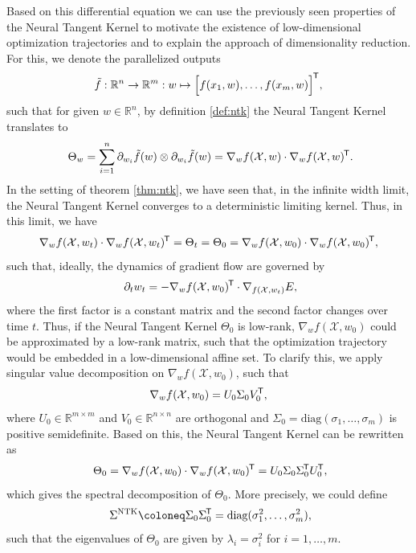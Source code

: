 \documentclass[11pt, a4paper]{article}
\newcommand{\R}{\mathbb{R}}
\newcommand{\X}{\mathcal{X}}
\newcommand*{\tr}{^{\mkern-1.5mu\mathsf{T}}}
\begin{document}
Based on this differential equation we can use the previously seen properties of the Neural Tangent Kernel to motivate the existence of low-dimensional optimization trajectories and to explain the approach of dimensionality reduction. For this, we denote the parallelized outputs
\[ \tilde{f}: \R^{n} \to \R^m : w \mapsto \Big [ f(x_1,w), \dots, f(x_m,w) \Big ]\tr , \]
such that for given $w \in \R^n$, by definition \ref{def:ntk} the Neural Tangent Kernel translates to
\[ \Theta_{w} = \sum_{i=1}^{n} \partial_{w_i} \tilde{f}(w) \otimes \partial_{w_i} \tilde{f}(w) = \nabla_wf(\X,w) \cdot \nabla_wf(\X,w)\tr. \]
In the setting of theorem \ref{thm:ntk}, we have seen that, in the infinite width limit, the Neural Tangent Kernel converges to a deterministic limiting kernel. Thus, in this limit, we have
\[ \nabla_wf(\X,w_t) \cdot \nabla_wf(\X,w_t)\tr = \Theta_t = \Theta_0 = \nabla_wf(\X,w_0) \cdot \nabla_wf(\X,w_0)\tr, \] 
such that, ideally, the dynamics of gradient flow are governed by
\[ \partial_tw_t = - \nabla_w f(\X, w_0)\tr \cdot \nabla_{f(\X,w_t)} E, \]
where the first factor is a constant matrix and the second factor changes over time $t$. Thus, if the Neural Tangent Kernel $\Theta_0$ is low-rank, $\nabla_wf(\X,w_0)$ could be approximated by a low-rank matrix, such that the optimization trajectory would be embedded in a low-dimensional affine set. To clarify this, we apply singular value decomposition on $\nabla_wf(\X,w_0)$, such that 
\[ \nabla_wf(\X,w_0) = U_0 \Sigma_0 V_0\tr , \]
where $U_0 \in \R^{m \times m}$ and $V_0 \in \R^{n \times n}$ are orthogonal and $\Sigma_0 = \text{diag}(\sigma_1, \dots, \sigma_m)$ is positive semidefinite. Based on this, the Neural Tangent Kernel can be rewritten as
\[ \Theta_0 = \nabla_wf(\X,w_0) \cdot \nabla_wf(\X,w_0)\tr  = U_0 \Sigma_0 \Sigma_0\tr  U_0\tr, \]
which gives the spectral decomposition of $\Theta_0$. More precisely, we could define
\[ \Sigma^\text{NTK} \coloneq \Sigma_0 \Sigma_0 \tr = \text{diag}(\sigma_1^2, \dots, \sigma_m^2), \]
such that the eigenvalues of $\Theta_0$ are given by $\lambda_i = \sigma_i^2$ for $i=1, \dots, m$.
\end{document}

